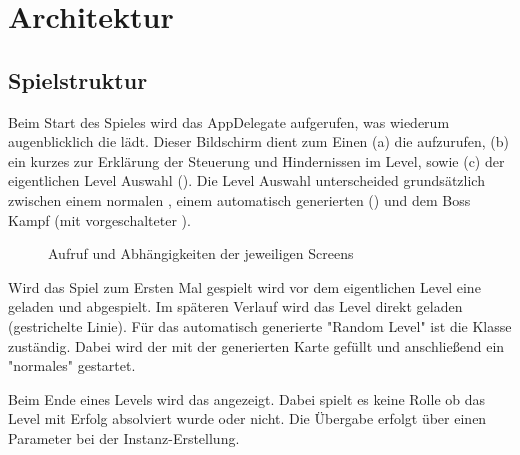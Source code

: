 \chapter{Architektur}\label{ch:arch}

\section{Spielstruktur}\label{sec:3_Spielstruktur}




\label{sec:3_Klassenuebersicht}

Beim Start des Spieles wird das AppDelegate aufgerufen, was wiederum augenblicklich die  lädt. Dieser Bildschirm dient zum Einen (a) die  aufzurufen, (b) ein kurzes  zur Erklärung der Steuerung und Hindernissen im Level, sowie (c) der eigentlichen Level Auswahl ().
Die Level Auswahl unterscheided grundsätzlich zwischen einem normalen , einem automatisch generierten () und dem Boss Kampf (mit vorgeschalteter ).

\begin{figure}[H]
\scalebox{0.7}{}
\caption{Aufruf und Abhängigkeiten der jeweiligen Screens}
\label{calltree}
\end{figure}


Wird das Spiel zum Ersten Mal gespielt wird vor dem eigentlichen Level eine  geladen und abgespielt. Im späteren Verlauf wird das Level direkt geladen (gestrichelte Linie).
Für das automatisch generierte "Random Level" ist die  Klasse zuständig. Dabei wird der  mit der generierten Karte gefüllt und anschließend ein "normales"  gestartet.

Beim Ende eines Levels wird das  angezeigt. Dabei spielt es keine Rolle ob das Level mit Erfolg absolviert wurde oder nicht. Die Übergabe erfolgt über einen Parameter bei der Instanz-Erstellung.

